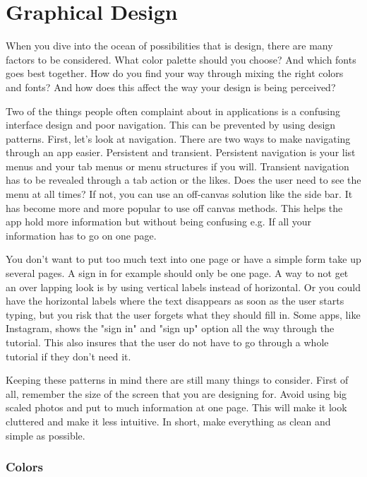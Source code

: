 \section{Graphical Design}
When you dive into the ocean of possibilities that is design, there are many factors to be considered. What color palette should you choose? And which fonts goes best together. How do you find your way through mixing the right colors and fonts? And how does this affect the way your design is being perceived? 

Two of the things people often complaint about in applications is a confusing interface design and poor navigation. \cite{Pattern} This can be prevented by using design patterns. 
First, let's look at navigation. There are two ways to make navigating through an app easier. Persistent and transient. Persistent navigation is your list menus and your tab menus or menu structures if you will. Transient navigation has to be revealed through a tab action or the likes.\cite{Pattern}
Does the user need to see the menu at all times? If not, you can use an off-canvas solution like the side bar. 
It has become more and more popular to use off canvas methods. \cite{Pattern} This helps the app hold more information but without being confusing e.g. If all your information has to go on one page. 

You don't want to put too much text into one page or have a simple form take up several pages. A sign in for example should only be one page. A way to not get an over lapping look is by using vertical labels instead of horizontal. \cite{Pattern} Or you could have the horizontal labels where the text disappears as soon as the user starts typing, but you risk that the user forgets what they should fill in.\cite{Pattern} 
Some apps, like Instagram, shows the "sign in" and "sign up" option all the way through the tutorial. This also insures that the user do not have to go through a whole tutorial if they don’t need it. 

Keeping these patterns in mind there are still many things to consider. 
First of all, remember the size of the screen that you are designing for. Avoid using big scaled photos and put to much information at one page. This will make it look cluttered and make it less intuitive. \cite{Graphic}
In short, make everything as clean and simple as possible. 

\subsubsection{Colors}

